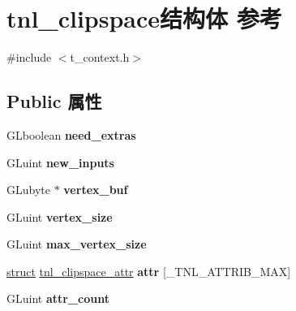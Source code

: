 \hypertarget{structtnl__clipspace}{}\section{tnl\+\_\+clipspace结构体 参考}
\label{structtnl__clipspace}


{\ttfamily \#include $<$t\+\_\+context.\+h$>$}

\subsection*{Public 属性}
\begin{DoxyCompactItemize}
\item 
\mbox{\label{structtnl__clipspace_af4223aac9a63ddc5b85cb9c7b1010e84}} 
G\+Lboolean {\bfseries need\+\_\+extras}
\item 
\mbox{\label{structtnl__clipspace_a094f5d95a580ecc8c0dd86a7997dcfdd}} 
G\+Luint {\bfseries new\+\_\+inputs}
\item 
\mbox{\label{structtnl__clipspace_ac45c976d836cc5479b5977cd5ec25cd1}} 
G\+Lubyte $\ast$ {\bfseries vertex\+\_\+buf}
\item 
\mbox{\label{structtnl__clipspace_adfb34b7ea7352dbe9b5a717d5c420d20}} 
G\+Luint {\bfseries vertex\+\_\+size}
\item 
\mbox{\label{structtnl__clipspace_a7242247cf29ecf0391f4657c6c2e662f}} 
G\+Luint {\bfseries max\+\_\+vertex\+\_\+size}
\item 
\mbox{\label{structtnl__clipspace_a0d1df9eea43c3cd0f7d0f59354d724cf}} 
\hyperlink{interfacestruct}{struct} \hyperlink{structtnl__clipspace__attr}{tnl\+\_\+clipspace\+\_\+attr} {\bfseries attr} \mbox{[}\+\_\+\+T\+N\+L\+\_\+\+A\+T\+T\+R\+I\+B\+\_\+\+M\+AX\mbox{]}
\item 
\mbox{\label{structtnl__clipspace_a9c219393b3641e60476984b2b6977bfa}} 
G\+Luint {\bfseries attr\+\_\+count}
\item 
\mbox{\label{structtnl__clipspace_a31514dfb4763c4b3390474a379b51456}} 

\end{DoxyCompactItemize}
